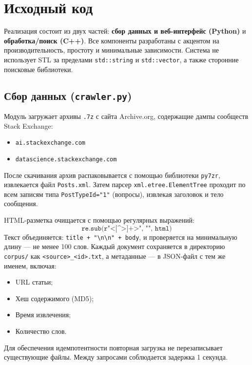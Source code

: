 \section{Исходный код}
Реализация состоит из двух частей: \textbf{сбор данных и веб-интерфейс (Python)} и \textbf{обработка/поиск (C++)}. Все компоненты разработаны с акцентом на производительность, простоту и минимальные зависимости. Система не использует STL за пределами \texttt{std::string} и \texttt{std::vector}, а также сторонние поисковые библиотеки.

\subsection*{Сбор данных (\texttt{crawler.py})}
Модуль загружает архивы \texttt{.7z} с сайта Archive.org, содержащие дампы сообществ Stack Exchange:
\begin{itemize}
\item \texttt{ai.stackexchange.com}
\item \texttt{datascience.stackexchange.com}
\end{itemize}
После скачивания архив распаковывается с помощью библиотеки \texttt{py7zr}, извлекается файл \texttt{Posts.xml}. Затем парсер \texttt{xml.etree.ElementTree} проходит по всем записям типа \texttt{PostTypeId="1"} (вопросы), извлекая заголовок и тело сообщения.

HTML-разметка очищается с помощью регулярных выражений:
\[
\texttt{re.sub(r"<[^>]+>", "", html)}
\]
Текст объединяется: \texttt{title + "\textbackslash n\textbackslash n" + body}, и проверяется на минимальную длину — не менее 100 слов. Каждый документ сохраняется в директорию \texttt{corpus/} как \texttt{<source>\_<id>.txt}, а метаданные — в JSON-файл с тем же именем, включая:
\begin{itemize}
\item URL статьи;
\item Хеш содержимого (MD5);
\item Время извлечения;
\item Количество слов.
\end{itemize}
Для обеспечения идемпотентности повторная загрузка не перезаписывает существующие файлы. Между запросами соблюдается задержка 1 секунда.

